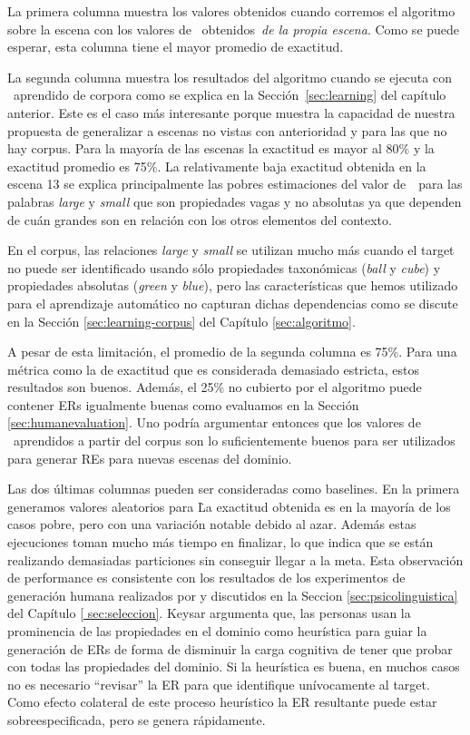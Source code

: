 \begin{table}[H]
La primera columna muestra los valores obtenidos cuando corremos el algoritmo sobre la escena
con los valores de \puse\ obtenidos~\emph{de la propia escena}. Como se puede esperar,
esta columna tiene el mayor promedio de exactitud.

La segunda columna muestra los resultados del algoritmo cuando se ejecuta con \puse\ aprendido de
corpora como se explica en la Secci\'on~\ref{sec:learning} del cap\'itulo anterior. Este es el caso m\'as interesante porque muestra la capacidad de nuestra propuesta de generalizar a escenas no vistas con anterioridad y para las que no hay corpus. Para la mayor\'{i}a de las escenas la exactitud
es mayor al 80\% y la exactitud promedio es 75\%. La relativamente baja exactitud
obtenida en la escena 13 se explica principalmente las pobres estimaciones del valor de~\puse\ para las palabras \emph{large} y \emph{small} que son propiedades vagas y no absolutas ya que dependen de cu\'an grandes son en relaci\'on con los otros elementos del contexto.  

En el corpus, las relaciones \emph{large} y \emph{small} se utilizan mucho m\'as cuando el target no puede ser identificado usando s\'olo propiedades taxon\'omicas (\emph{ball} y \emph{cube}) y propiedades absolutas (\emph{green} y \emph{blue}), pero las caracter\'{i}sticas que hemos utilizado para el aprendizaje autom\'atico no capturan dichas dependencias como se discute en la Secci\'on \ref{sec:learning-corpus} del Cap\'itulo \ref{sec:algoritmo}.

A pesar de esta limitaci\'on, el promedio de la segunda columna es 75\%. Para una m\'etrica como la de exactitud que es considerada demasiado estricta, estos resultados son buenos. Adem\'as, el 25\% no cubierto por el algoritmo puede contener ERs igualmente buenas como evaluamos en la Secci\'on \ref{sec:humanevaluation}. Uno podr\'ia argumentar entonces que los valores de \puse\ aprendidos a partir del corpus son lo suficientemente buenos para ser utilizados para generar REs para nuevas escenas del dominio.

Las dos \'ultimas columnas pueden ser consideradas como baselines. En la primera generamos
valores aleatorios para \puse\. La exactitud obtenida es en la mayor\'{i}a de los casos pobre, pero con
una variaci\'on notable debido al azar. Adem\'as estas ejecuciones toman mucho m\'as tiempo en finalizar, lo que indica que se est\'an realizando demasiadas particiones sin conseguir llegar a la meta. Esta observaci\'on de performance es consistente con los resultados de los experimentos de generaci\'on humana realizados por \cite{keysar:Curr98,} y discutidos en la Seccion \ref{sec:psicolinguistica} del Cap\'itulo \ref{ sec:seleccion}. Keysar argumenta que, las personas usan la prominencia de las propiedades en el dominio como heur\'istica para guiar la generaci\'on de ERs de forma de disminuir la carga cognitiva de tener que probar con todas las propiedades del dominio. Si la heur\'istica es buena, en muchos casos no es necesario ``revisar'' la ER para que identifique un\'ivocamente al target. Como efecto colateral de este proceso heur\'istico la ER resultante puede estar sobreespecificada, pero se genera r\'apidamente.  


\end{table}
